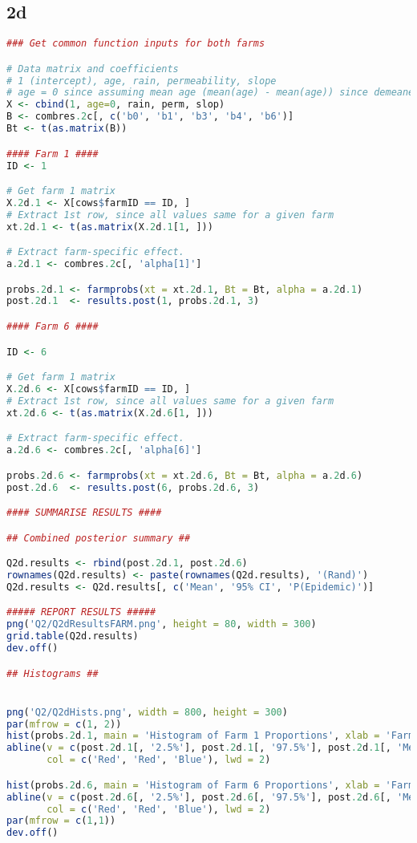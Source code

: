 \documentclass[11pt]{article}
\begin{document}
\subsection{2d} \label{appA2d}
\begin{lstlisting}[language=R]
### Get common function inputs for both farms

# Data matrix and coefficients
# 1 (intercept), age, rain, permeability, slope
# age = 0 since assuming mean age (mean(age) - mean(age)) since demeaned variable
X <- cbind(1, age=0, rain, perm, slop)
B <- combres.2c[, c('b0', 'b1', 'b3', 'b4', 'b6')]
Bt <- t(as.matrix(B))

#### Farm 1 ####
ID <- 1

# Get farm 1 matrix
X.2d.1 <- X[cows$farmID == ID, ]
# Extract 1st row, since all values same for a given farm
xt.2d.1 <- t(as.matrix(X.2d.1[1, ]))

# Extract farm-specific effect. 
a.2d.1 <- combres.2c[, 'alpha[1]']

probs.2d.1 <- farmprobs(xt = xt.2d.1, Bt = Bt, alpha = a.2d.1)
post.2d.1  <- results.post(1, probs.2d.1, 3)

#### Farm 6 ####

ID <- 6

# Get farm 1 matrix
X.2d.6 <- X[cows$farmID == ID, ]
# Extract 1st row, since all values same for a given farm
xt.2d.6 <- t(as.matrix(X.2d.6[1, ]))

# Extract farm-specific effect. 
a.2d.6 <- combres.2c[, 'alpha[6]']

probs.2d.6 <- farmprobs(xt = xt.2d.6, Bt = Bt, alpha = a.2d.6)
post.2d.6  <- results.post(6, probs.2d.6, 3)

#### SUMMARISE RESULTS ####

## Combined posterior summary ##

Q2d.results <- rbind(post.2d.1, post.2d.6)
rownames(Q2d.results) <- paste(rownames(Q2d.results), '(Rand)') 
Q2d.results <- Q2d.results[, c('Mean', '95% CI', 'P(Epidemic)')]

##### REPORT RESULTS #####
png('Q2/Q2dResultsFARM.png', height = 80, width = 300)
grid.table(Q2d.results)
dev.off()

## Histograms ##


png('Q2/Q2dHists.png', width = 800, height = 300)
par(mfrow = c(1, 2))
hist(probs.2d.1, main = 'Histogram of Farm 1 Proportions', xlab = 'Farm 1 Proportion')
abline(v = c(post.2d.1[, '2.5%'], post.2d.1[, '97.5%'], post.2d.1[, 'Mean']), 
       col = c('Red', 'Red', 'Blue'), lwd = 2)

hist(probs.2d.6, main = 'Histogram of Farm 6 Proportions', xlab = 'Farm 6 Proportion')
abline(v = c(post.2d.6[, '2.5%'], post.2d.6[, '97.5%'], post.2d.6[, 'Mean']), 
       col = c('Red', 'Red', 'Blue'), lwd = 2)
par(mfrow = c(1,1))
dev.off()
\end{lstlisting}
\end{document}
